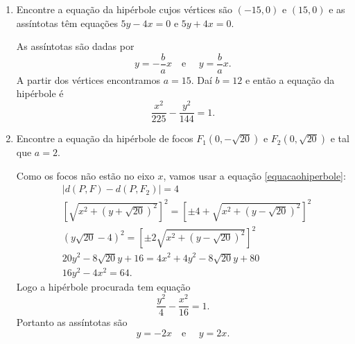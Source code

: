 \begin{exemplos}
    \begin{enumerate}
        \item Encontre a equação da hipérbole cujos vértices são $(-15,0)$ e $(15,0)$ e as assíntotas têm equações $5y - 4x = 0$ e $5y + 4x = 0$.
              \begin{solucao}
                  As assíntotas são dadas por
                  \[
                      y = -\dfrac{b}{a}x \quad\mbox{e }\quad y = \dfrac{b}{a}x.
                  \]
                  A partir dos vértices encontramos $a = 15$. Daí $b = 12$ e então a equação da hipérbole é
                  \[
                      \dfrac{x^2}{225} - \dfrac{y^2}{144} = 1.
                  \]
              \end{solucao}
        \item Encontre a equação da hipérbole de focos $F_1(0,-\sqrt{20})$ e $F_2(0,\sqrt{20})$ e tal que $a = 2$.
              \begin{solucao}
                  Como os focos não estão no eixo $x$, vamos usar a equação \eqref{equacaohiperbole}:
                  \begin{align*}
                       & \mid d(P,F) - d(P,F_2)\mid = 4                                                                        \\
                       & \left[\sqrt{x^2 + (y + \sqrt{20})^2}\right]^2 = \left[\pm 4 + \sqrt{x^2 + (y - \sqrt{20})^2}\right]^2 \\
                       & (y\sqrt{20} - 4)^2 = \left[\pm 2\sqrt{x^2 + (y - \sqrt{20})^2}\right]^2                               \\
                       & 20y^2 - 8\sqrt{20}y + 16 = 4x^2 + 4y^2 - 8\sqrt{20}y + 80                                             \\
                       & 16y^2 - 4x^2 = 64.
                  \end{align*}
                  Logo a hipérbole procurada tem equação
                  \[
                      \dfrac{y^2}{4} - \dfrac{x^2}{16} = 1.
                  \]
                  Portanto as assíntotas são
                  \[
                      y = -2x \quad\mbox{e }\quad y = 2x.
                  \]
              \end{solucao}


\end{enumerate}
\end{exemplos}
